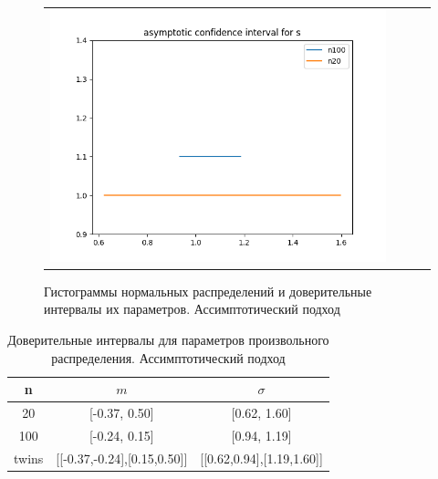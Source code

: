 \begin{figure}[H]
\begin{tabular}{cccc}
		\includegraphics[scale=0.3]{asymptotic_s.png}
	\end{tabular}
	\caption{Гистограммы нормальных распределений и доверительные интервалы их параметров. Ассимптотический подход}
\end{figure}

\begin{table}[H]
	\begin{center}
		\begin{tabular}{|c|c|c|}
			\hline 
			n & $m$ & $\sigma$ \\
			\hline \hline 
			20 & [-0.37, 0.50] & [0.62, 1.60] \\
			\hline 
			100 & [-0.24, 0.15] & [0.94, 1.19] \\
			\hline
			twins & [[-0.37,-0.24],[0.15,0.50]] & [[0.62,0.94],[1.19,1.60]]\\
			\hline 
		\end{tabular}
	\end{center}
	\caption{Доверительные интервалы для параметров произвольного распределения. Ассимптотический подход}
\end{table} 

